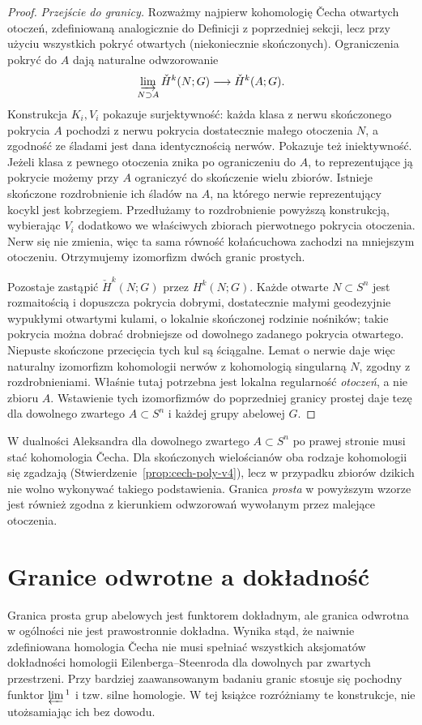 \begin{proof}
\emph{Przejście do granicy.}
Rozważmy najpierw kohomologię \v{C}echa otwartych
otoczeń, zdefiniowaną analogicznie do
Definicji z poprzedniej sekcji, lecz przy użyciu
wszystkich pokryć otwartych (niekoniecznie skończonych).
Ograniczenia pokryć do $A$ dają naturalne
odwzorowanie
\[
 \varinjlim_{N\supset A}\check H^k(N;G)
 \longrightarrow\check H^k(A;G).
\]
Konstrukcja $K_i,V_i$ pokazuje surjektywność:
każda klasa z nerwu skończonego pokrycia $A$
pochodzi z nerwu pokrycia dostatecznie małego
otoczenia $N$, a zgodność ze śladami jest dana
identycznością nerwów. Pokazuje też iniektywność.
Jeżeli klasa z pewnego otoczenia znika po ograniczeniu
do $A$, to reprezentujące ją pokrycie możemy
przy $A$ ograniczyć do skończenie wielu zbiorów.
Istnieje skończone rozdrobnienie ich śladów na $A$,
na którego nerwie reprezentujący kocykl jest
kobrzegiem. Przedłużamy to rozdrobnienie powyższą
konstrukcją, wybierając $V_i$ dodatkowo we właściwych
zbiorach pierwotnego pokrycia otoczenia.
Nerw się nie zmienia, więc ta sama równość
kołańcuchowa zachodzi na mniejszym otoczeniu.
Otrzymujemy izomorfizm dwóch granic prostych.

Pozostaje zastąpić $\check H^k(N;G)$ przez
$H^k(N;G)$. Każde otwarte $N\subset S^n$ jest
rozmaitością i dopuszcza pokrycia dobrymi,
dostatecznie małymi geodezyjnie wypukłymi
otwartymi kulami, o lokalnie skończonej rodzinie
nośników; takie pokrycia można dobrać drobniejsze
od dowolnego zadanego pokrycia otwartego.
Niepuste skończone przecięcia tych kul są
ściągalne. Lemat o nerwie daje więc naturalny
izomorfizm kohomologii nerwów z kohomologią
singularną $N$, zgodny z rozdrobnieniami.
Właśnie tutaj potrzebna jest lokalna regularność
\emph{otoczeń}, a nie zbioru $A$.
Wstawienie tych izomorfizmów do poprzedniej
granicy prostej daje tezę dla dowolnego zwartego
$A\subset S^n$ i każdej grupy abelowej $G$.
\end{proof}

\begin{uwaga}
W dualności Aleksandra dla dowolnego zwartego $A\subset S^n$
po prawej stronie musi stać kohomologia \v{C}echa.
Dla skończonych wielościanów oba rodzaje kohomologii
się zgadzają (Stwierdzenie~\ref{prop:cech-poly-v4}),
lecz w przypadku zbiorów dzikich nie wolno wykonywać
takiego podstawienia. Granica \emph{prosta} w powyższym
wzorze jest również zgodna z kierunkiem odwzorowań wywołanym
przez malejące otoczenia.
\end{uwaga}

\section{Granice odwrotne a dokładność}
Granica prosta grup abelowych jest funktorem dokładnym,
ale granica odwrotna w ogólności nie jest prawostronnie
dokładna. Wynika stąd, że naiwnie zdefiniowana homologia
\v{C}echa nie musi spełniać wszystkich aksjomatów dokładności
homologii Eilenberga--Steenroda dla dowolnych par zwartych
przestrzeni. Przy bardziej zaawansowanym badaniu granic
stosuje się pochodny funktor $\varprojlim{}^1$ i tzw.
silne homologie. W tej książce rozróżniamy te konstrukcje,
nie utożsamiając ich bez dowodu.

